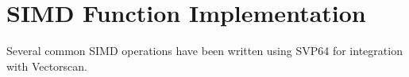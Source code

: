 %
\chapter{SIMD Function Implementation}

Several common SIMD operations have been written using SVP64 for integration
with Vectorscan.




